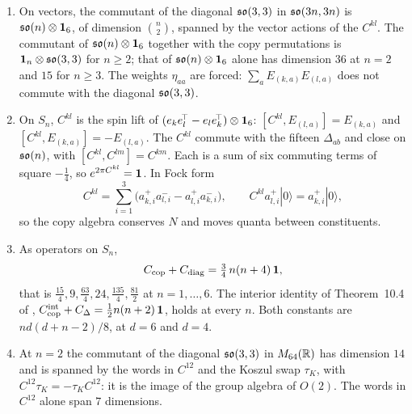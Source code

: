 \begin{theorem}
\label{e3:thm:dual}
\begin{enumerate}[label=(\roman*),leftmargin=2.2em]
\item On vectors, the commutant of the diagonal $\mathfrak{so}(3,3)$ in $\mathfrak{so}(3n,3n)$ is $\mathfrak{so}(n)\otimes\mathbf 1_6$, of dimension $\binom n2$, spanned by the vector
actions of the $C^{kl}$. The commutant of $\mathfrak{so}(n)\otimes\mathbf 1_6$ together with the copy permutations is $\mathbf 1_n\otimes\mathfrak{so}(3,3)$ for $n\ge2$; that of
$\mathfrak{so}(n)\otimes\mathbf 1_6$ alone has dimension $36$ at $n=2$ and $15$ for $n\ge3$. The weights $\eta_{aa}$ are forced: $\sum_aE_{(k,a)}E_{(l,a)}$ does not commute
with the diagonal $\mathfrak{so}(3,3)$.
\item On $S_n$, $C^{kl}$ is the spin lift of $(e_ke_l^{\!\top}-e_le_k^{\!\top})\otimes\mathbf 1_6$: $[C^{kl},E_{(l,a)}]=E_{(k,a)}$ and $[C^{kl},E_{(k,a)}]=-E_{(l,a)}$. The
$C^{kl}$ commute with the fifteen $\Delta_{ab}$ and close on $\mathfrak{so}(n)$, with $[C^{kl},C^{lm}]=C^{km}$. Each is a sum of six commuting terms of square
$-\tfrac14$, so $e^{2\pi C^{kl}}=\mathbf 1$. In Fock form
\[
C^{kl}=\sum_{i=1}^3\bigl(a^+_{k,i}a^-_{l,i}-a^+_{l,i}a^-_{k,i}\bigr),\qquad C^{kl}a^+_{l,i}|0\rangle=a^+_{k,i}|0\rangle,
\]
so the copy algebra conserves $N$ and moves quanta between constituents.
\item As operators on $S_n$,
\[
C_{\rm cop}+C_{\rm diag}=\tfrac34\,n(n+4)\,\mathbf 1,
\]
that is $\tfrac{15}4,9,\tfrac{63}4,24,\tfrac{135}4,\tfrac{81}2$ at $n=1,\dots,6$. The interior identity of Theorem~10.4 of \cite{ES17},
$C^{\rm int}_{\rm cop}+C_\Delta=\tfrac12 n(n+2)\,\mathbf 1$, holds at every $n$. Both constants are $nd(d+n-2)/8$, at $d=6$ and $d=4$.
\item At $n=2$ the commutant of the diagonal $\mathfrak{so}(3,3)$ in $M_{64}(\mathbb{R})$ has dimension $14$ and is spanned by the words in $C^{12}$ and the Koszul
swap $\tau_K$, with $C^{12}\tau_K=-\tau_KC^{12}$: it is the image of the group algebra of $O(2)$. The words in $C^{12}$ alone span $7$ dimensions.
\end{enumerate}
\end{theorem}

